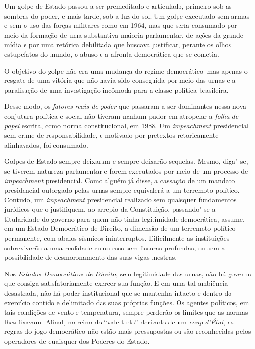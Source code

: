 Um golpe de Estado passou a ser premeditado e articulado, primeiro sob
as sombras do poder, e mais tarde, sob a luz do sol. Um golpe executado
sem armas e sem o uso das forças militares como em 1964, mas que seria
consumado por meio da formação de uma substantiva maioria parlamentar,
de ações da grande mídia e por uma retórica debilitada que buscava
justificar, perante os olhos estupefatos do mundo, o abuso e a afronta
democrática que se cometia.

O objetivo do golpe não era uma mudança do regime democrático, mas
apenas o resgate de uma vitória que não havia sido conseguida por meio
das urnas e a paralisação de uma investigação incômoda para a classe
política brasileira.

Desse modo, os \emph{fatores reais de poder} que passaram a ser
dominantes nessa nova conjutura política e social não tiveram nenhum
pudor em atropelar a \emph{folha de papel} escrita, como norma
constitucional, em 1988. Um \emph{impeachment} presidencial sem crime de
responsabilidade, e motivado por pretextos retoricamente alinhavados,
foi consumado.

Golpes de Estado sempre deixaram e sempre deixarão sequelas. Mesmo,
diga"-se, se tiverem natureza parlamentar e forem executados por meio de
um processo de \emph{impeachment} presidencial. Como alguém já disse, a
cassação de um mandato presidencial outorgado pelas urnas sempre
equivalerá a um terremoto político. Contudo, um \emph{impeachment}
presidencial realizado sem quaisquer fundamentos jurídicos que o
justifiquem, ao arrepio da Constituição, passando"-se a titularidade do
governo para quem não tinha legitimidade democrática, assume, em um
Estado Democrático de Direito, a dimensão de um terremoto político
permanente, com abalos sísmicos ininterruptos. Dificilmente as
instituições sobreviverão a uma realidade como essa sem fissuras
profundas, ou sem a possibilidade de desmoronamento das suas vigas
mestras.

Nos \emph{Estados Democráticos de Direito}, sem legitimidade das urnas,
não há governo que consiga satisfatoriamente exercer sua função. E em
uma tal ambiência desastrada, não há poder institucional que se mantenha
intacto e dentro do exercício contido e delimitado das suas próprias
funções. Os agentes políticos, em tais condições de vento e temperatura,
sempre perderão os limites que as normas lhes fixavam. Afinal, no reino
do ``vale tudo'' derivado de um \emph{coup d'État}, as regras do
jogo democrático não estão mais pressupostas ou são reconhecidas pelos
operadores de quaisquer dos Poderes do Estado.

